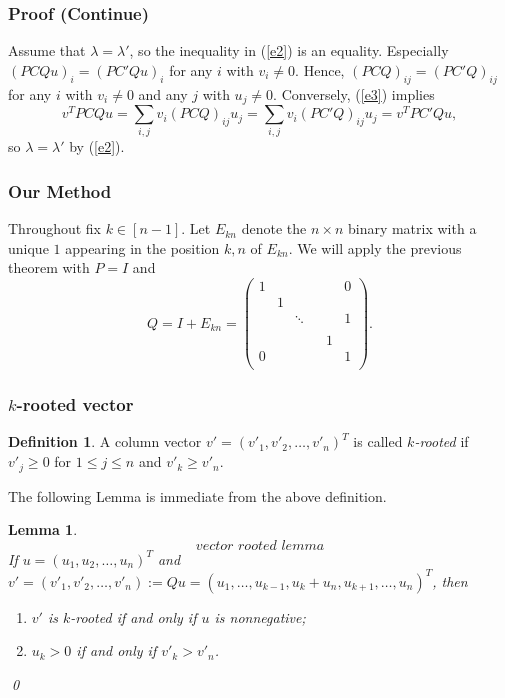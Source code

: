 \documentclass{beamer}
\theoremstyle{plain}
\newtheorem{lem}[thm]{Lemma}
\theoremstyle{definition}
\newtheorem{defn}[thm]{Definition}
\begin{document}
\begin{frame}
    \frametitle{ Proof (Continue)}
        Assume that $\lambda=\lambda'$, so the inequality in (\ref{e2}) is an equality.  Especially $(PCQu)_i=(PC'Qu)_i$ for any $i$ with $v_i\not=0.$ Hence, $(PCQ)_{ij}=(PC'Q)_{ij}$ for any $i$ with $v_i\not=0$ and any $j$ with $u_j\not=0.$ 
         Conversely, (\ref{e3}) implies $$v^TPCQu=\sum_{i,j} v_i(PCQ)_{ij}u_j=\sum_{i,j} v_i(PC'Q)_{ij}u_j=v^TPC'Qu,$$ so
            $\lambda=\lambda'$ by (\ref{e2}).
\end{frame}

\begin{frame}
    \frametitle{ Our Method}


 Throughout fix $k\in [n-1]$. Let $E_{kn}$ denote the $n\times n$ binary matrix with a unique $1$ appearing in the  position $k,n$ of $E_{kn}$. We will apply the previous theorem with $P=I$ and $$Q=I+E_{kn}=\begin{pmatrix}
1 &  & & &  & 0 \\
 & 1 &  &      &  &  \\
 &  & \ddots & &  & 1 \\
 &  &        & &  &  \\
  &  & & & 1 &  \\
0 &  & & &  & 1 \\
\end{pmatrix}.$$

\end{frame}

    \frametitle{ $k$-rooted vector}

\begin{defn}
 A column vector $v'=(v'_1,v'_2,\ldots,v'_n)^T$ is called {\it $k$-rooted}  if $v'_{j} \geq 0$ for $1 \leq  j \leq n$ and $v'_k\geq v'_n.$
\end{defn}
\bigskip

The following Lemma is immediate from the above definition.
\bigskip

\begin{lem}
\begin{equation}
    \textit{vector rooted lemma}\label{v_rooted}
\end{equation}
If $u=(u_1, u_2, \ldots, u_n)^T$ and $v'=(v'_1, v'_2, \ldots, v'_n):=Qu=(u_1,\ldots, u_{k-1},u_k+u_n, u_{k+1}, \ldots,  u_n)^T$, then
\begin{enumerate}
\item[(i)] $v'$ is $k$-rooted  if and only if  $u$ is nonnegative;
\item[(ii)] $u_k>0$ if and only if $v'_k>v'_n$.
\end{enumerate}
\qed
\end{lem}
\end{document}

